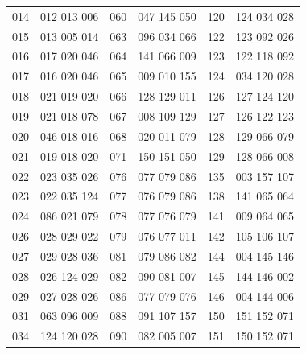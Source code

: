 \documentclass[12pt,fleqn]{article}
\begin{document}
\begin{table}[h]
\begin{center}
\begin{tabular}{|c|c|c|c|c|c|}
         014 &            012 013 006  &         060 &            047 145 050  &         120 &            124 034 028  \\
        015 &            013 005 014  &         063 &            096 034 066  &         122 &            123 092 026  \\
         016 &            017 020 046  &         064 &            141 066 009  &         123 &            122 118 092  \\
        017 &            016 020 046  &         065 &            009 010 155  &         124 &            034 120 028  \\
         018 &            021 019 020  &         066 &            128 129 011  &         126 &            127 124 120  \\
         019 &            021 018 078  &         067 &            008 109 129  &         127 &            126 122 123  \\
        020 &            046 018 016  &         068 &            020 011 079  &         128 &            129 066 079  \\
        021 &            019 018 020  &         071 &            150 151 050  &         129 &            128 066 008  \\
        022 &            023 035 026  &         076 &            077 079 086  &         135 &            003 157 107  \\
         023 &            022 035 124  &         077 &            076 079 086  &         138 &            141 065 064  \\
         024 &            086 021 079  &         078 &            077 076 079  &         141 &            009 064 065  \\
        026 &            028 029 022  &         079 &            076 077 011  &         142 &            105 106 107  \\
         027 &            029 028 036  &         081 &            079 086 082  &         144 &            004 145 146  \\
         028 &            026 124 029  &         082 &            090 081 007  &         145 &            144 146 002  \\
         029 &            027 028 026  &         086 &            077 079 076  &         146 &            004 144 006  \\
         031 &            063 096 009  &         088 &            091 107 157  &         150 &            151 152 071  \\
         034 &            124 120 028  &         090 &            082 005 007  &         151 &            150 152 071  \\

\end{tabular}
\end{center}
\end{table}
\end{document}

